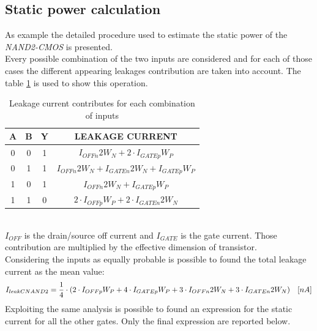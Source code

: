 \documentclass[12pt,  english, makeidx, a4paper, titlepage, oneside]{article}
\begin{document}
\subsection{Static power calculation}

As example the detailed procedure used to estimate the static power of the \textit{NAND2-CMOS} is presented.\\
Every possible combination of the two inputs are considered and for each of those cases the different appearing leakages contribution are taken into account.
The table \ref{tab:i_leakage_CMOS} is used to show this operation.
\begin{table}[htb]
\centering
\begin{tabular}{|c|c|c|c|}
\hline
A & B & Y & LEAKAGE CURRENT\\
\hline
0 & 0 & 1 & $ I_{OFFn} 2W_N+2\cdot I_{GATEp}W_P$\\
\hline
0 & 1 & 1 & $I_{OFFn}2W_N+ I_{GATEn}2W_N+I_{GATEp}W_P$\\
\hline
1 & 0 & 1 & $I_{OFFn}2W_N+I_{GATEp}W_P$\\
\hline
1 & 1 & 0 & $2\cdot I_{OFFp}W_P+2\cdot I_{GATEn}2W_N$\\
\hline
\end{tabular}
\caption{Leakage current contributes for each combination of inputs}
\label{tab:i_leakage_CMOS}
\end{table}\\
$I_{OFF}$ is the drain/source off current and $I_{GATE}$ is the gate current. Those contribution are multiplied by the effective dimension of transistor.\\
Considering the inputs as equally probable is possible to found the total leakage current as the mean value:
\begin{equation}
I_{leakCNAND2}=  {1 \over 4}\cdot(2 \cdot I_{OFFp}W_P+4 \cdot I_{GATEp}W_P+3 \cdot I_{OFFn}2W_N+3 \cdot I_{GATEn}2W_N) \quad [nA]
\end{equation}
Exploiting the same analysis is possible to found an expression for the static current for all the other gates.
Only the final expression are reported below.
\end{document}
